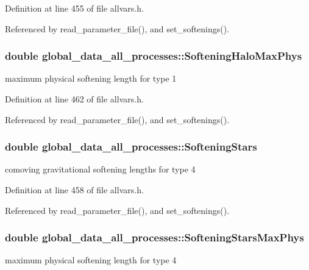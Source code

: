 Definition at line 455 of file allvars.h.



Referenced by read\_\-parameter\_\-file(), and set\_\-softenings().

\hypertarget{structglobal__data__all__processes_a1d4f323715e8df4ea4be9296348cca25}{
\subsubsection[{SofteningHaloMaxPhys}]{\setlength{\rightskip}{0pt plus 5cm}double {\bf global\_\-data\_\-all\_\-processes::SofteningHaloMaxPhys}}}
\label{structglobal__data__all__processes_a1d4f323715e8df4ea4be9296348cca25}
maximum physical softening length for type 1 

Definition at line 462 of file allvars.h.



Referenced by read\_\-parameter\_\-file(), and set\_\-softenings().

\hypertarget{structglobal__data__all__processes_a5502dc85fd165d33e9ba8d0f8c01867c}{
\subsubsection[{SofteningStars}]{\setlength{\rightskip}{0pt plus 5cm}double {\bf global\_\-data\_\-all\_\-processes::SofteningStars}}}
\label{structglobal__data__all__processes_a5502dc85fd165d33e9ba8d0f8c01867c}
comoving gravitational softening lengths for type 4 

Definition at line 458 of file allvars.h.



Referenced by read\_\-parameter\_\-file(), and set\_\-softenings().

\hypertarget{structglobal__data__all__processes_a7ace4652c6c05275e4fa28dfe6fb374e}{
\subsubsection[{SofteningStarsMaxPhys}]{\setlength{\rightskip}{0pt plus 5cm}double {\bf global\_\-data\_\-all\_\-processes::SofteningStarsMaxPhys}}}
\label{structglobal__data__all__processes_a7ace4652c6c05275e4fa28dfe6fb374e}
maximum physical softening length for type 4 

